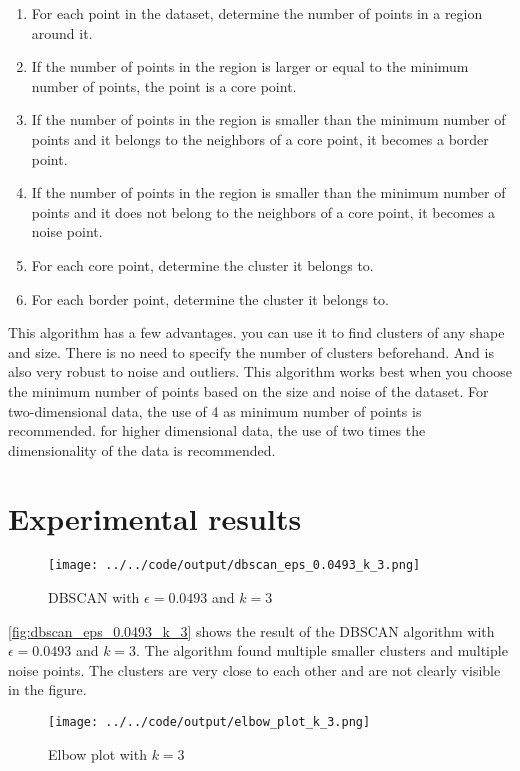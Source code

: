 \documentclass[twoside, a4paper, fleqn, reqno]{article}
\begin{document}
\begin{enumerate}
	\item For each point in the dataset, determine the number of points in a region around it.
	\item If the number of points in the region is larger or equal to the minimum number of points, the point is a core point.
	\item If the number of points in the region is smaller than the minimum number of points and it belongs to the neighbors of a core point, it becomes a border point.
	\item If the number of points in the region is smaller than the minimum number of points and it does not belong to the neighbors of a core point, it becomes a noise point.
	\item For each core point, determine the cluster it belongs to.
	\item For each border point, determine the cluster it belongs to.
\end{enumerate}
This algorithm has a few advantages. you can use it to find clusters of any shape and size.
There is no need to specify the number of clusters beforehand. And is also very robust to noise and outliers.
This algorithm works best when you choose the minimum number of points based on the size and noise of the dataset.
For two-dimensional data, the use of 4 as minimum number of points is recommended.
for higher dimensional data, the use of two times the dimensionality of the data is recommended.

\section{Experimental results}

\begin {figure}[H]
	\centering
	\texttt{[image: ../../code/output/dbscan\_eps\_0.0493\_k\_3.png]}
	\caption{DBSCAN with $\epsilon=0.0493$ and $k=3$}
	\label{fig:dbscan_eps_0.0493_k_3}
\end {figure}

\autoref{fig:dbscan_eps_0.0493_k_3} shows the result of the DBSCAN algorithm with $\epsilon=0.0493$ and $k=3$.
The algorithm found multiple smaller clusters and multiple noise points.
The clusters are very close to each other and are not clearly visible in the figure.

\begin {figure}[H]
	\centering
	\texttt{[image: ../../code/output/elbow\_plot\_k\_3.png]}
	\caption{Elbow plot with $k=3$}
	\label{fig:elbow_plot_k_3}
\end {figure}
\end{document}
